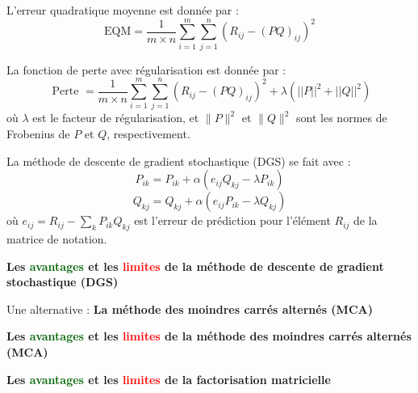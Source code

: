 \begin{frame}{\PartII}
	L'erreur quadratique moyenne est donnée par :
	\begin{equation*}
		\mathrm{EQM}=\frac{1}{m \times n} \sum_{i=1}^m \sum_{j=1}^n\left(R_{i j}-(P Q)_{i j}\right)^2
	\end{equation*}

\end{frame}

\begin{frame}{\PartII}
	La fonction de perte avec régularisation est donnée par :
	\begin{equation*}
		\text { Perte }=\frac{1}{m \times n} \sum_{i=1}^m \sum_{j=1}^n\left(R_{i j}-(P Q)_{i j}\right)^2+\lambda\left(||P||^2+||Q||^2\right)
	\end{equation*}
	où $\lambda$ est le facteur de régularisation, et $\|P\|^2$ et $\|Q\|^2$ sont les normes de Frobenius de $P$ et $Q$, respectivement.
\end{frame}

\begin{frame}{\PartII}
	La méthode de descente de gradient stochastique (DGS) se fait avec :
	\begin{equation*}
		P_{i k}=P_{i k}+\alpha\left(e_{i j} Q_{k j}-\lambda P_{i k}\right)
	\end{equation*}
	\begin{equation*}
		Q_{k j}=Q_{k j}+\alpha\left(e_{i j} P_{i k}-\lambda Q_{k j}\right)
	\end{equation*}
	où $e_{i j}=R_{i j}-\sum_k P_{i k} Q_{k j}$ est l'erreur de prédiction pour l'élément $R_{i j}$ de la matrice de notation.
\end{frame}

\begin{frame}{\PartII}
	\begin{center}
		\textbf{\large{Les \textcolor{darkgreen}{avantages} et les \textcolor{red}{limites} de la méthode de descente de gradient stochastique (DGS)}}
	\end{center}
\end{frame}

\begin{frame}{\PartII}
	\begin{center}
		\large{Une alternative : \textbf{La méthode des moindres carrés alternés (MCA)}}
	\end{center}
\end{frame}

\begin{frame}{\PartII}
	\begin{center}
		\textbf{\large{Les \textcolor{darkgreen}{avantages} et les \textcolor{red}{limites} de la méthode des moindres carrés alternés (MCA)}}
	\end{center}
\end{frame}

\begin{frame}{\PartII}
	\begin{center}
		\textbf{\large{Les \textcolor{darkgreen}{avantages} et les \textcolor{red}{limites} de la factorisation matricielle}}
	\end{center}
\end{frame}